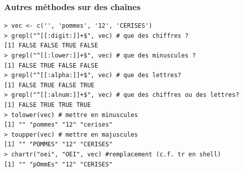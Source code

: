 \documentclass[10pt]{beamer}
\begin{document}
\begin{frame}[fragile]
  \frametitle{Autres méthodes sur des chaînes}
  \begin{lstlisting}
> vec <- c('', 'pommes', '12', 'CERISES')
> grepl("^[[:digit:]]+$", vec) # que des chiffres ?
[1] FALSE FALSE TRUE FALSE
> grepl("^[[:lower:]]+$", vec) # que des minuscules ?
[1] FALSE TRUE FALSE FALSE
> grepl("^[[:alpha:]]+$", vec) # que des lettres?
[1] FALSE TRUE FALSE TRUE
> grepl("^[[:alnum:]]+$", vec) # que des chiffres ou des lettres?
[1] FALSE TRUE TRUE TRUE
> tolower(vec) # mettre en minuscules
[1] "" "pommes" "12" "cerises"
> toupper(vec) # mettre en majuscules
[1] "" "POMMES" "12" "CERISES"
> chartr("oei", "OEI", vec) #remplacement (c.f. tr en shell)
[1] "" "pOmmEs" "12" "CERISES"
  \end{lstlisting}
\end{frame}
\end{document}
